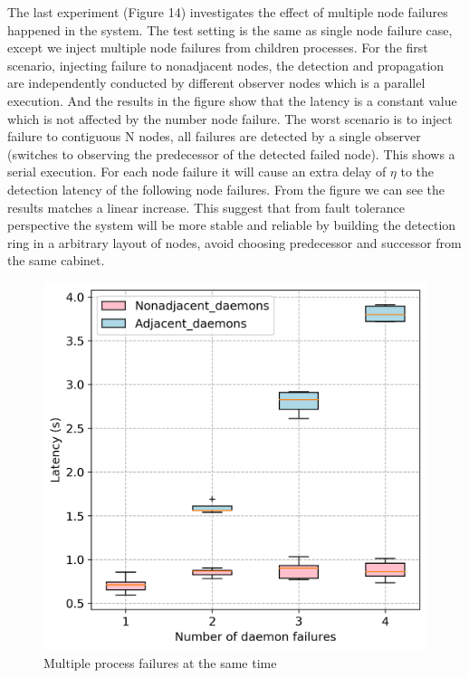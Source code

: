 \documentclass[sigconf]{acmart}
\begin{document}
The last experiment (Figure 14) investigates the effect of multiple node failures happened in the system. The test setting is the same as single node failure case, except we inject multiple node failures from children processes. For the first scenario, injecting failure to nonadjacent nodes, the detection and propagation are independently conducted by different observer nodes which is a parallel execution. And the results in the figure show that the latency is a constant value which is not affected by the number node failure. The worst scenario is to inject failure to contiguous N nodes, all failures are detected by a single observer (switches to observing the predecessor of the detected failed node). This shows a serial execution. For each node failure it will cause an extra delay of $ \eta $ to the detection latency of the following node failures. From the figure we can see the results matches a linear increase. This suggest that from fault tolerance perspective the system will be more stable and reliable by building the detection ring in a arbitrary layout of nodes, avoid choosing predecessor and successor from the same cabinet.  

\begin{figure}[h]
  \centering
  \includegraphics[width=\linewidth]{multi_daemon_failures.png}
  \caption{Multiple process failures at the same time}
\end{figure}
\end{document}
